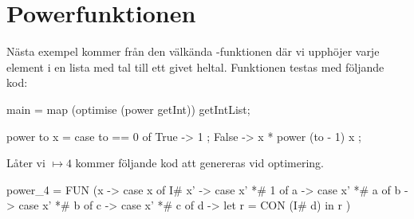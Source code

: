 \documentclass[Rapport]{subfiles}
\begin{document}

\section{Powerfunktionen}
Nästa exempel kommer från den välkända -funktionen där vi upphöjer varje element i en lista med tal till ett givet heltal. Funktionen testas med följande kod:
\begin{codeEx}
main = map (optimise (power getInt)) getIntList;

power to x = case to == 0 of
    { True  -> 1
    ; False -> x * power (to - 1) x
    };
\end{codeEx}

Låter vi  $\mapsto 4$ kommer följande kod att genereras vid optimering.

\begin{codeEx}
power_4 = FUN (x -> case x of
    { I# x' -> case x' *# 1 of
       { a -> case x' *# a of
          { b -> case x' *# b of
             { c -> case x' *# c of
                { d -> let
                   { r = CON (I# d)
                   } in r
                }
             }
          }
       }
    })
\end{codeEx}
\end{document}
